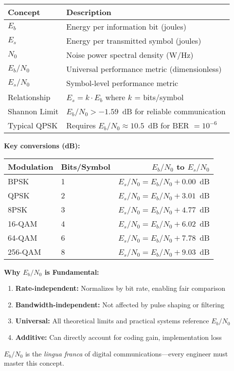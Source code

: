 \begin{center}
\begin{tabular}{@{}ll@{}}
\toprule
\textbf{Concept} & \textbf{Description} \\
\midrule
$E_b$ & Energy per information bit (joules) \\
$E_s$ & Energy per transmitted symbol (joules) \\
$N_0$ & Noise power spectral density (W/Hz) \\
$E_b/N_0$ & Universal performance metric (dimensionless) \\
$E_s/N_0$ & Symbol-level performance metric \\
Relationship & $E_s = k \cdot E_b$ where $k$ = bits/symbol \\
Shannon Limit & $E_b/N_0 > -1.59$~dB for reliable communication \\
Typical QPSK & Requires $E_b/N_0 \approx 10.5$~dB for BER $= 10^{-6}$ \\
\bottomrule
\end{tabular}
\end{center}

\vspace{10pt}

\textbf{Key conversions (dB):}

\begin{center}
\begin{tabular}{@{}llr@{}}
\toprule
Modulation & Bits/Symbol & $E_b/N_0$ to $E_s/N_0$ \\
\midrule
BPSK & 1 & $E_s/N_0 = E_b/N_0 + 0.00$~dB \\
QPSK & 2 & $E_s/N_0 = E_b/N_0 + 3.01$~dB \\
8PSK & 3 & $E_s/N_0 = E_b/N_0 + 4.77$~dB \\
16-QAM & 4 & $E_s/N_0 = E_b/N_0 + 6.02$~dB \\
64-QAM & 6 & $E_s/N_0 = E_b/N_0 + 7.78$~dB \\
256-QAM & 8 & $E_s/N_0 = E_b/N_0 + 9.03$~dB \\
\bottomrule
\end{tabular}
\end{center}

\begin{keyconcept}
\textbf{Why $E_b/N_0$ is Fundamental:}

\begin{enumerate}
\item \textbf{Rate-independent:} Normalizes by bit rate, enabling fair comparison
\item \textbf{Bandwidth-independent:} Not affected by pulse shaping or filtering
\item \textbf{Universal:} All theoretical limits and practical systems reference $E_b/N_0$
\item \textbf{Additive:} Can directly account for coding gain, implementation loss
\end{enumerate}

$E_b/N_0$ is the \textit{lingua franca} of digital communications---every engineer must master this concept.
\end{keyconcept}

